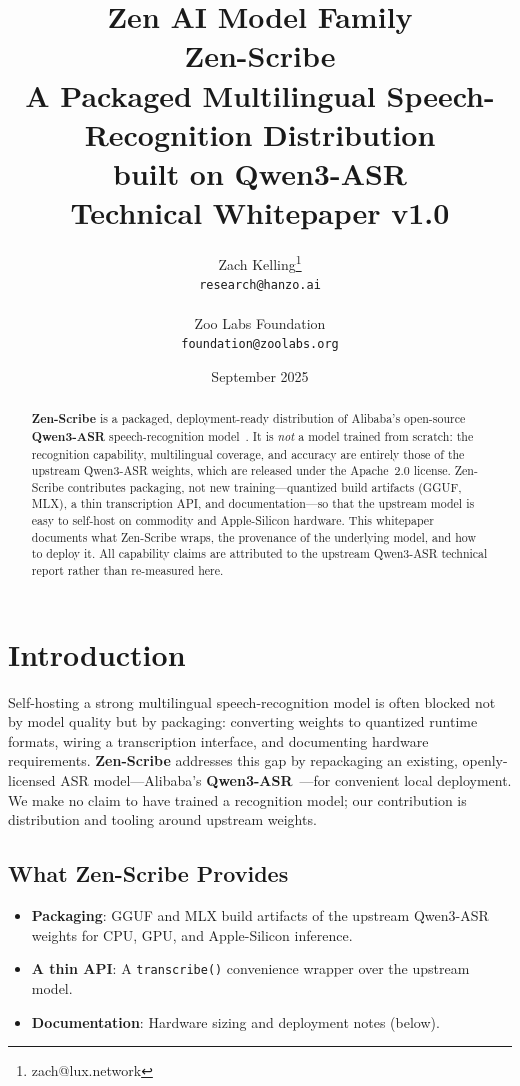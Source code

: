 \documentclass[11pt,a4paper]{article}
\title{
    \vspace{-2cm}
    \Large \textbf{Zen AI Model Family} \\
    \vspace{0.5cm}
    \Huge \textbf{Zen-Scribe} \\
    \vspace{0.3cm}
    \large A Packaged Multilingual Speech-Recognition Distribution \\
    built on Qwen3-ASR \\
    \vspace{0.5cm}
    \normalsize Technical Whitepaper v1.0
}
\author{
    Zach Kelling\thanks{zach@lux.network} \\
    \texttt{research@hanzo.ai} \\
    \\
    Zoo Labs Foundation \\
    \texttt{foundation@zoolabs.org}
}
\date{September 2025}
\begin{document}
\maketitle

\begin{abstract}
\textbf{Zen-Scribe} is a packaged, deployment-ready distribution of Alibaba's
open-source \textbf{Qwen3-ASR} speech-recognition model~\cite{qwen3asr}. It is
\emph{not} a model trained from scratch: the recognition capability, multilingual
coverage, and accuracy are entirely those of the upstream Qwen3-ASR weights, which
are released under the Apache~2.0 license. Zen-Scribe contributes packaging, not new
training---quantized build artifacts (GGUF, MLX), a thin transcription API, and
documentation---so that the upstream model is easy to self-host on commodity and
Apple-Silicon hardware. This whitepaper documents what Zen-Scribe wraps, the
provenance of the underlying model, and how to deploy it. All capability claims are
attributed to the upstream Qwen3-ASR technical report rather than re-measured here.
\end{abstract}

\tableofcontents
\newpage

\section{Introduction}

Self-hosting a strong multilingual speech-recognition model is often blocked not by
model quality but by packaging: converting weights to quantized runtime formats,
wiring a transcription interface, and documenting hardware requirements.
\textbf{Zen-Scribe} addresses this gap by repackaging an existing, openly-licensed
ASR model---Alibaba's \textbf{Qwen3-ASR}~\cite{qwen3asr}---for convenient local
deployment. We make no claim to have trained a recognition model; our contribution is
distribution and tooling around upstream weights.

\subsection{What Zen-Scribe Provides}
\begin{itemize}
    \item \textbf{Packaging}: GGUF and MLX build artifacts of the upstream Qwen3-ASR
          weights for CPU, GPU, and Apple-Silicon inference.
    \item \textbf{A thin API}: A \texttt{transcribe()} convenience wrapper over the
          upstream model.
    \item \textbf{Documentation}: Hardware sizing and deployment notes (below).
\end{itemize}
\end{document}
